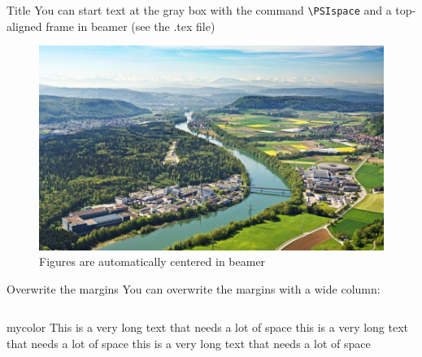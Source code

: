 \documentclass[aspectratio=43]{beamer}
\begin{document}
 \begin{frame}[t]{Title}
   \PSIvspace
  You can start text at the gray box with the command \texttt{\textbackslash PSIspace} and a top-aligned frame in beamer (see the .tex file)
  \begin{figure}
    \includegraphics[width=0.3\pagewidth]{PSIlandscape43}
    \caption{Figures are automatically centered in beamer}
    \label{fig:PSI}
  \end{figure}
\end{frame}

\begin{frame}[t]{Overwrite the margins}
  You can overwrite the margins with a wide column:
\begin{columns}
  \begin{beamercolorbox}[wd=1.18\textwidth, dp=0.7\textheight]{mycolor}
    This is a very long text that needs a lot of space this is a very long text that needs a lot of space this is a very long text that needs a lot of space
  \end{beamercolorbox}
\end{columns}
\end{frame}

  
\end{document}

